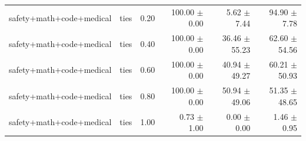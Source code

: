 \documentclass{article}
\begin{document}
\begin{table}[H]
{\begin{tabular}{lllrrr}
safety+math+code+medical & ties & 0.20 & 100.00 $\pm$ 0.00 & 5.62 $\pm$ 7.44 & 94.90 $\pm$ 7.78 \\
safety+math+code+medical & ties & 0.40 & 100.00 $\pm$ 0.00 & 36.46 $\pm$ 55.23 & 62.60 $\pm$ 54.56 \\
safety+math+code+medical & ties & 0.60 & 100.00 $\pm$ 0.00 & 40.94 $\pm$ 49.27 & 60.21 $\pm$ 50.93 \\
safety+math+code+medical & ties & 0.80 & 100.00 $\pm$ 0.00 & 50.94 $\pm$ 49.06 & 51.35 $\pm$ 48.65 \\
safety+math+code+medical & ties & 1.00 & 0.73 $\pm$ 1.00 & 0.00 $\pm$ 0.00 & 1.46 $\pm$ 0.95 \\
\bottomrule
\end{tabular}
}
\end{table}


\end{document}
